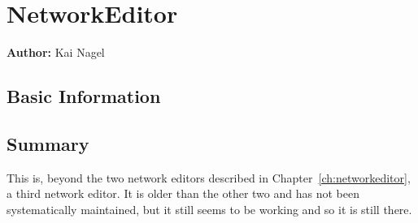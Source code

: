 \chapter{NetworkEditor}
\label{sec:contrib-networkEditor}

\hfill \textbf{Author:} Kai Nagel


\section{Basic Information}

\section{Summary}
This is, beyond the two network editors described in Chapter~\ref{ch:networkeditor}, a third network editor. 
It is older than the other two and has not been systematically maintained, but it still seems to be working and so it is still there.

